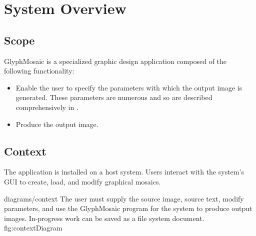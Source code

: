 \section{System Overview}
\subsection{Scope}
GlyphMosaic is a specialized graphic design application composed of the following functionality:
\begin{itemize}
  \item Enable the user to specify the parameters with which the output image is generated.  These parameters are numerous and so are described comprehensively in .
  \item Produce the output image.
\end{itemize}


\subsection{Context}
The application is installed on a host system.
Users interact with the system's GUI to create, load, and modify graphical mosaics.

\sidiagram
{diagrams/context}
{The user must supply the source image, source text, modify parameters, and use the GlyphMosaic program for the system to produce output images.  In-progress work can be saved as a file system document.}
{fig:contextDiagram}
{\diagsize}